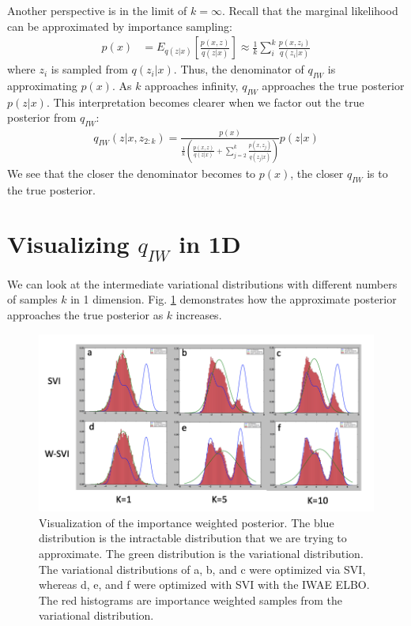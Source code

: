 \documentclass{article} %
\begin{document}
Another perspective is in the limit of ${k=\infty}$. Recall that the marginal likelihood can be approximated by importance sampling:
\begin{align} 
    p(x) &= E_{q(z|x)}\left[\frac{p(x,z)}{q(z|x)} \right] \approx \frac{1}{k}\sum_i^k \frac{p(x,z_i)}{q(z_i|x)}
\end{align}
where $z_i$ is sampled from $q(z_i|x)$. Thus, the denominator of $q_{IW}$ is approximating $p(x)$. As $k$ approaches infinity, $q_{IW}$ approaches the true posterior $p(z|x)$. This interpretation becomes clearer when we factor out the true posterior from $q_{IW}$:
\begin{align} 
q_{IW}(z|x,z_{2:k}) =  \frac{p(x)}{  \frac{1}{k} \left( \frac{p(x,z)}{q(z|x)}+ \sum_{j=2}^k \frac{p(x,z_j)}{q(z_j|x)} \right) }  p(z|x)
\end{align}
We see that the closer the denominator becomes to $p(x)$, the closer $q_{IW}$ is to the true posterior.




\section{Visualizing \texorpdfstring{$q_{IW}$}{} in 1D}

We can look at the intermediate variational distributions with different numbers of samples $k$ in 1 dimension. Fig. \ref{viz} demonstrates how the approximate posterior approaches the true posterior as $k$ increases. 

\begin{figure}[H]
  \centering
      \includegraphics[width=1.\textwidth]{figs/posteriors.png}
  \caption{Visualization of the importance weighted posterior. The blue distribution is the intractable distribution that we are trying to approximate. The green distribution is the variational distribution. The variational distributions of a, b, and c were optimized via SVI, whereas d, e, and f were optimized with SVI with the IWAE ELBO. The red histograms are importance weighted samples from the variational distribution.}
  \label{viz}
\end{figure}
\end{document}
